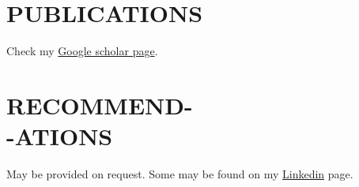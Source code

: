 \documentclass[margin, 10pt]{res} %
\begin{document}
\begin{resume}
\section{PUBLICATIONS} 
Check my \href{https://scholar.google.com/citations?user=HjM0XDoAAAAJ&hl=en}{Google scholar page}.



\section{RECOMMEND- \\-ATIONS } 
May be provided on request. Some may be found on my \href{https://www.linkedin.com/in/ikramu/}{Linkedin} page.  %


\end{resume}
\end{document}
